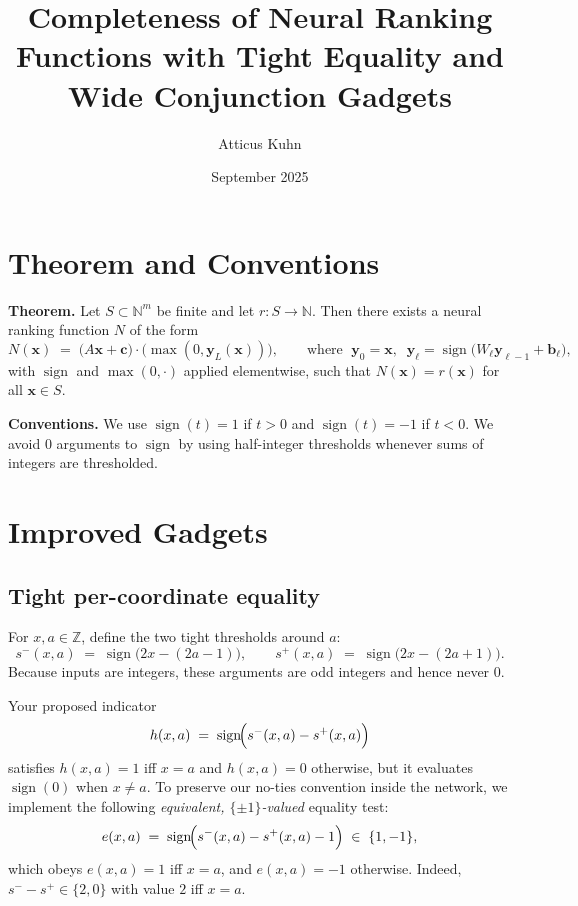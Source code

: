 \documentclass{article}
\title{Completeness of Neural Ranking Functions with Tight Equality and Wide Conjunction Gadgets}
\author{Atticus Kuhn}
\date{September 2025}
\newcommand{\sign}{\operatorname{sign}}
\newcommand{\NN}{\mathbb{N}}
\newcommand{\ZZ}{\mathbb{Z}}
\begin{document}
\maketitle

\section{Theorem and Conventions}

\begin{flushleft}
\textbf{Theorem.}
Let $S \subset \NN^m$ be finite and let $r : S \to \NN$. Then there exists a neural ranking function $N$ of the form
\[
N(\mathbf{x}) \;=\; \bigl(A \mathbf{x} + \mathbf{c}\bigr) \cdot \bigl(\max(0, \mathbf{y}_L(\mathbf{x}))\bigr),
\qquad \text{where }\;\mathbf{y}_0 = \mathbf{x},\;\; \mathbf{y}_{\ell}=\sign\!\bigl(W_{\ell}\mathbf{y}_{\ell-1}+ \mathbf{b}_{\ell}\bigr),
\]
with $\sign$ and $\max(0,\cdot)$ applied elementwise, such that $N(\mathbf{x}) = r(\mathbf{x})$ for all $\mathbf{x}\in S$.
\end{flushleft}

\begin{flushleft}
\textbf{Conventions.}
We use $\sign(t)=1$ if $t>0$ and $\sign(t)=-1$ if $t<0$.
We avoid $0$ arguments to $\sign$ by using half-integer thresholds whenever sums of integers are thresholded.
\end{flushleft}

\section{Improved Gadgets}

\subsection*{Tight per-coordinate equality}

\begin{flushleft}
For $x,a\in\ZZ$, define the two tight thresholds around $a$:
\[
s^{-}(x,a)\;=\;\sign\!\bigl(2x-(2a-1)\bigr),\qquad
s^{+}(x,a)\;=\;\sign\!\bigl(2x-(2a+1)\bigr).
\]
Because inputs are integers, these arguments are odd integers and hence never $0$.

Your proposed indicator
\[
h(x,a)\;=\;\sign\!\Bigl(s^{-}(x,a)-s^{+}(x,a)\Bigr)
\]
satisfies $h(x,a)=1$ iff $x=a$ and $h(x,a)=0$ otherwise, but it evaluates $\sign(0)$ when $x\neq a$. To preserve our no-ties convention inside the network, we implement the following \emph{equivalent, $\{\pm1\}$-valued} equality test:
\[
e(x,a)\;=\;\sign\!\Bigl(s^{-}(x,a)-s^{+}(x,a)-1\Bigr)\;\in\;\{1,-1\},
\]
which obeys $e(x,a)=1$ iff $x=a$, and $e(x,a)=-1$ otherwise. Indeed, $s^{-}-s^{+}\in\{2,0\}$ with value $2$ iff $x=a$.
\end{flushleft}
\end{document}
